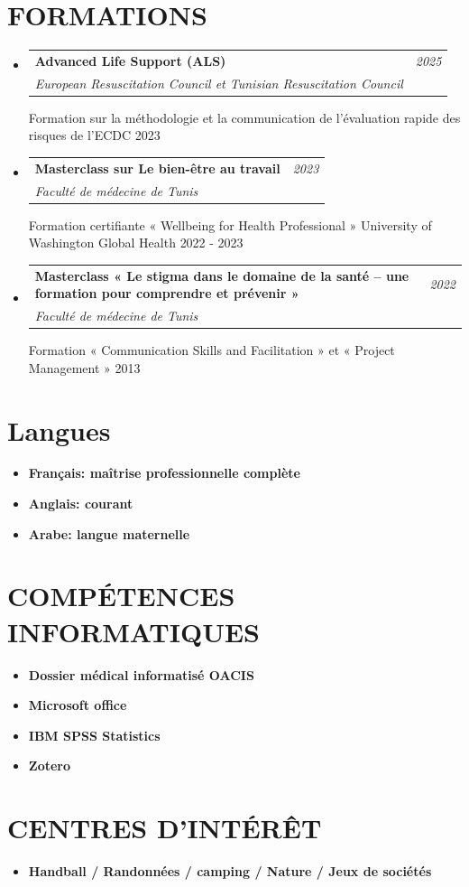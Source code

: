 \documentclass[a4paper,11pt]{article}
\makeatletter
\newcommand{\resumeItem}[2]{
  \item{
    \textbf{#1}{\hspace{0.5mm}#2 \vspace{-0.5mm}}
  }
}
\newcommand{\resumeProject}[4]{
\vspace{0.5mm}\item
    \begin{tabular*}{0.98\textwidth}[t]{l@{\extracolsep{\fill}}r}
        \textbf{#1} & \textit{\footnotesize{#3}} \\
        \footnotesize{\textit{#2}} & \footnotesize{#4}
    \end{tabular*}
    \vspace{-2.4mm}
}
\newcommand{\resumeSubItem}[2]{\resumeItem{#1}{#2}\vspace{-4pt}}
\newcommand{\resumeSubHeadingListStart}{\begin{itemize}[leftmargin=*,labelsep=1mm]}
\newcommand{\resumeHeadingSkillStart}{\begin{itemize}[leftmargin=*,itemsep=1.7mm, rightmargin=2ex]}
\newcommand{\resumeSubHeadingListEnd}{\end{itemize}\vspace{2mm}}
\newcommand{\resumeHeadingSkillEnd}{\end{itemize}\vspace{-2mm}}
\makeatother
\begin{document}
\vspace{-0.4mm}
\section{\textbf{FORMATIONS}}
\vspace{-0.2mm}
\resumeSubHeadingListStart

\resumeProject
  {Advanced Life Support (ALS) }
  {European Resuscitation Council et Tunisian Resuscitation Council}
  {2025}

\resumeProject
  {Formation sur la méthodologie et la communication de l’évaluation rapide des risques de l’ECDC}
  {}
  {2023}

\vspace{-2mm}

\resumeProject
  {Masterclass sur Le bien-être au travail }
  {Faculté de médecine de Tunis}
  {2023}

\resumeProject
  {Formation certifiante « Wellbeing for Health Professional »}
  {University of Washington Global Health}
  {2022 - 2023}

\resumeProject
  {Masterclass « Le stigma dans le domaine de la santé – une formation pour comprendre et prévenir »}
  {Faculté de médecine de Tunis}
  {2022}

\resumeProject
  {Formation « Communication Skills and Facilitation » et « Project Management »}
  {}
  {2013}

\resumeSubHeadingListEnd

\vspace{-8mm}
\section{\textbf{Langues}}
\vspace{-0.4mm}
 \resumeHeadingSkillStart
  \resumeSubItem{Français: maîtrise professionnelle complète}
    {}
  \resumeSubItem{Anglais: courant}
    {}
  \resumeSubItem{Arabe: langue maternelle}
    {}
 \resumeHeadingSkillEnd

\vspace{-1mm}

\section{\textbf{COMPÉTENCES INFORMATIQUES}}
\vspace{-0.4mm}
 \resumeHeadingSkillStart
  \resumeSubItem{Dossier médical informatisé OACIS}
    {}
  \resumeSubItem{Microsoft office}
    {}
  \resumeSubItem{IBM SPSS Statistics}
    {}
  \resumeSubItem{Zotero}
    {}
 \resumeHeadingSkillEnd

\vspace{-1mm}

\section{\textbf{CENTRES D’INTÉRÊT}}
\vspace{-0.4mm}
 \resumeHeadingSkillStart
  \resumeSubItem{Handball / Randonnées / camping / Nature / Jeux de sociétés}
    {}
 \resumeHeadingSkillEnd
\end{document}
